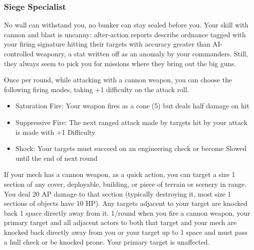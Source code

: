 \subsubsection{Siege Specialist}

\begin{talent}
{No wall can withstand you, no bunker can stay sealed before you. Your skill with cannon and blast is uncanny: after-action reports describe ordnance tagged with your firing signature hitting their targets with accuracy greater than AI-controlled weaponry, a stat written off as an anomaly by your commanders. Still, they always seem to pick you for missions where they bring out the big guns.}

Once per round, while attacking with a cannon weapon, you can choose the following firing modes, taking +1 difficulty on the attack roll. 
\begin{itemize}
\item Saturation Fire: Your weapon fires as a cone (5) but deals half damage on hit 
\item Suppressive Fire: The next ranged attack made by targets hit by your attack is made with +1 Difficulty 
\item Shock: Your targets must succeed on an engineering check or become Slowed until the end of next round 
\end{itemize}
If your mech has a cannon weapon, as a quick action, you can target a size 1 section of any cover, deployable, building, or piece of terrain or scenery in range. You deal 20 AP damage to that section (typically destroying it, most size 1 sections of objects have 10 HP). Any targets adjacent to your target are knocked back 1 space directly away from it. 
1/round when you fire a cannon weapon, your primary target and all adjacent actors to both that target and your mech are knocked back directly away from you or your target up to 1 space and must pass a hull check or be knocked prone. Your primary target is unaffected.
\end{talent}
